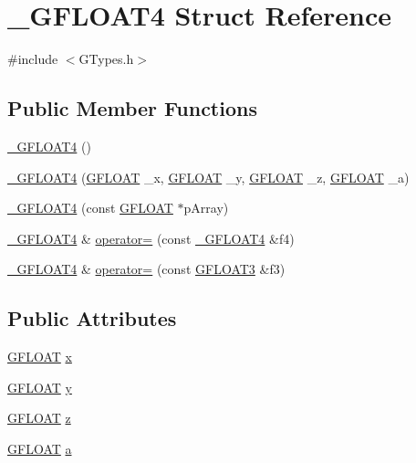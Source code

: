 \hypertarget{struct___g_f_l_o_a_t4}{}\section{\+\_\+\+G\+F\+L\+O\+A\+T4 Struct Reference}
\label{struct___g_f_l_o_a_t4}


{\ttfamily \#include $<$G\+Types.\+h$>$}

\subsection*{Public Member Functions}
\begin{DoxyCompactItemize}
\item 
\hyperlink{struct___g_f_l_o_a_t4_af453a26dcd034ec89880db853a8a1b54}{\+\_\+\+G\+F\+L\+O\+A\+T4} ()
\item 
\hyperlink{struct___g_f_l_o_a_t4_a73a267f3d1a27b50a8fd72d40641a2f2}{\+\_\+\+G\+F\+L\+O\+A\+T4} (\hyperlink{_g_types_8h_abf6eba8223df62f199b811a6c52ff2ef}{G\+F\+L\+O\+A\+T} \+\_\+x, \hyperlink{_g_types_8h_abf6eba8223df62f199b811a6c52ff2ef}{G\+F\+L\+O\+A\+T} \+\_\+y, \hyperlink{_g_types_8h_abf6eba8223df62f199b811a6c52ff2ef}{G\+F\+L\+O\+A\+T} \+\_\+z, \hyperlink{_g_types_8h_abf6eba8223df62f199b811a6c52ff2ef}{G\+F\+L\+O\+A\+T} \+\_\+a)
\item 
\hyperlink{struct___g_f_l_o_a_t4_ac188cbdafd40aa41e694543879f43f38}{\+\_\+\+G\+F\+L\+O\+A\+T4} (const \hyperlink{_g_types_8h_abf6eba8223df62f199b811a6c52ff2ef}{G\+F\+L\+O\+A\+T} $\ast$p\+Array)
\item 
\hyperlink{struct___g_f_l_o_a_t4}{\+\_\+\+G\+F\+L\+O\+A\+T4} \& \hyperlink{struct___g_f_l_o_a_t4_a05e7033b6171d67d3b5c8e131a6110b1}{operator=} (const \hyperlink{struct___g_f_l_o_a_t4}{\+\_\+\+G\+F\+L\+O\+A\+T4} \&f4)
\item 
\hyperlink{struct___g_f_l_o_a_t4}{\+\_\+\+G\+F\+L\+O\+A\+T4} \& \hyperlink{struct___g_f_l_o_a_t4_add9b1a8c052c089df51c041b9a5eeb9f}{operator=} (const \hyperlink{_g_types_8h_a7f35886af6bc3271b59984611c1028fb}{G\+F\+L\+O\+A\+T3} \&f3)
\end{DoxyCompactItemize}
\subsection*{Public Attributes}
\begin{DoxyCompactItemize}
\item 
\hyperlink{_g_types_8h_abf6eba8223df62f199b811a6c52ff2ef}{G\+F\+L\+O\+A\+T} \hyperlink{struct___g_f_l_o_a_t4_ad38242f9bef0a562e6bdb3c08985e434}{x}
\item 
\hyperlink{_g_types_8h_abf6eba8223df62f199b811a6c52ff2ef}{G\+F\+L\+O\+A\+T} \hyperlink{struct___g_f_l_o_a_t4_a6bbd34c5b00c322cd7e17df0a47f9b91}{y}
\item 
\hyperlink{_g_types_8h_abf6eba8223df62f199b811a6c52ff2ef}{G\+F\+L\+O\+A\+T} \hyperlink{struct___g_f_l_o_a_t4_a8d4c5d28952dca8ba3bd31478dce77fe}{z}
\item 
\hyperlink{_g_types_8h_abf6eba8223df62f199b811a6c52ff2ef}{G\+F\+L\+O\+A\+T} \hyperlink{struct___g_f_l_o_a_t4_a11ff967d590695404082aa470c8559e6}{a}
\end{DoxyCompactItemize}


